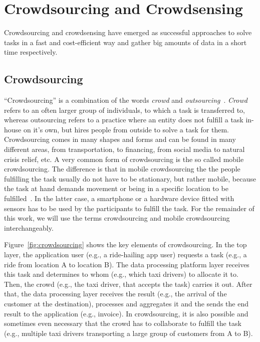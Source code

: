 \section{Crowdsourcing and Crowdsensing}
\label{sec:crowdsourcing_crowdsensing_background}
Crowdsourcing and crowdsensing have emerged as successful approaches to solve tasks in a fast and cost-efficient way and gather big amounts of data in a short time respectively.

\subsection*{Crowdsourcing}
``Crowdsourcing'' is a combination of the words \textit{crowd} and \textit{outsourcing}~\cite{howe2006rise}.
\textit{Crowd} refers to an often larger group of individuals, to which a task is transferred to, whereas outsourcing refers to a practice where an entity does not fulfill a task in-house on it's own, but hires people from outside to solve a task for them.
Crowdsourcing comes in many shapes and forms and can be found in many different areas, from transportation, to financing, from social media to natural crisis relief, etc.
A very common form of crowdsourcing is the so called mobile crowdsourcing.
The difference is that in mobile crowdsourcing the the people fulfilling the task usually do not have to be stationary, but rather mobile, because the task at hand demands movement or being in a specific location to be fulfilled~\cite{phuttharak2018review}.
In the latter case, a smartphone or a hardware device fitted with sensors has to be used by the participants to fulfill the task.
For the remainder of this work, we will use the terms crowdsourcing and mobile crowdsourcing interchangeably.

Figure~\ref{fig:crowdsourcing} shows the key elements of crowdsourcing.
In the top layer, the application user (e.g., a ride-hailing app user) requests a task (e.g., a ride from location A to location B).
The data processing platform layer receives this task and determines to whom (e.g., which taxi drivers) to allocate it to.
Then, the crowd (e.g., the taxi driver, that accepts the task) carries it out.
After that, the data processing layer receives the result (e.g., the arrival of the customer at the destination), processes and aggregates it and the sends the end result to the application (e.g., invoice).
In crowdsourcing, it is also possible and sometimes even necessary that the crowd has to collaborate to fulfill the task (e.g., multiple taxi drivers transporting a large group of customers from A to B).

